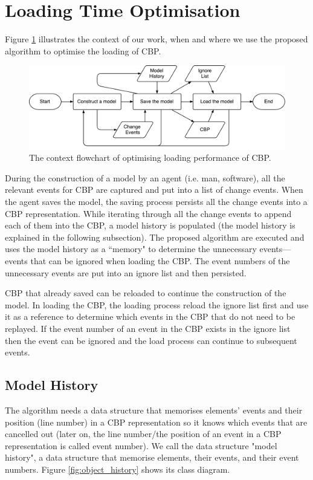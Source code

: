 \documentclass{llncs}
\begin{document}
\section{Loading Time Optimisation}
\label{sec:loading_time_optimisation}
Figure \ref{fig:flowchart} illustrates the context of our work, when and where we use the proposed algorithm to optimise the loading of CBP. 

\begin{figure}[ht]
\centering
\includegraphics[width=\linewidth]{flowchart}
\caption{The context flowchart of optimising loading performance of CBP.}
\label{fig:flowchart}
\end{figure}


During the construction of a model by an agent (i.e. man, software), all the relevant events for CBP are captured and put into a list of change events. When the agent saves the model, the saving process persists all the change events into a CBP representation. While iterating through all the change events to append each of them into the CBP, a model history is populated (the model history is explained in the following subsection). The proposed algorithm are executed and uses the model history as a ``memory" to determine the unnecessary events---events that can be ignored when loading the CBP. The event numbers of the unnecessary events are put into an ignore list and then persisted. 

CBP that already saved can be reloaded to continue the construction of the model. In loading the CBP, the loading process reload the ignore list first and use it as a reference to determine which events in the CBP that do not need to be replayed. If the event number of an event in the CBP exists in the ignore list then the event can be ignored and the load process can continue to subsequent events. 

\subsection{Model History}
The algorithm needs a data structure that memorises elements' events and their position (line number) in a CBP representation so it knows which events that are cancelled out (later on, the line number/the position of an event in a CBP representation is called event number). We call the data structure "model history", a data structure that memorise elements, their events, and their event numbers. Figure \ref{fig:object_history} shows its class diagram.  
\end{document}

